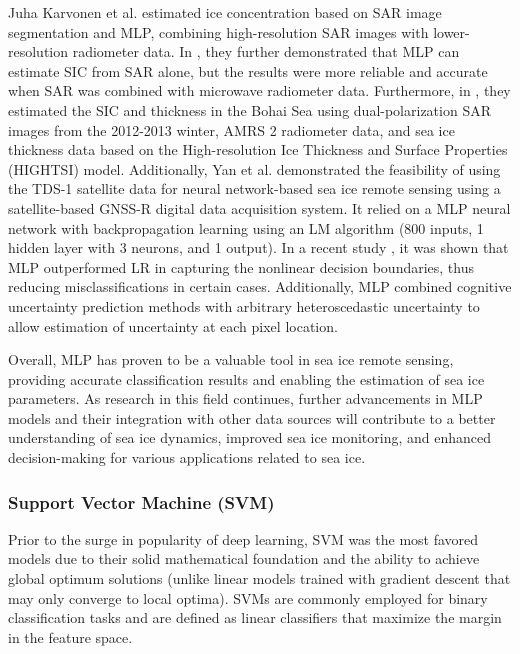 Juha Karvonen et al. \cite{49karvonen2014sea} estimated ice concentration based on SAR image segmentation and MLP, combining high-resolution SAR images with lower-resolution radiometer data. In \cite{50karvonen2017baltic}, they further demonstrated that MLP can estimate SIC from SAR alone, but the results were more reliable and accurate when SAR was combined with microwave radiometer data. Furthermore, in \cite{52karvonen2017bohai}, they estimated the SIC and thickness in the Bohai Sea using dual-polarization SAR images from the 2012-2013 winter, AMRS 2 radiometer data, and sea ice thickness data based on the High-resolution Ice Thickness and Surface Properties (HIGHTSI) model. Additionally, Yan et al. \cite{51yan2017neural} demonstrated the feasibility of using the TDS-1 satellite data for neural network-based sea ice remote sensing using a satellite-based GNSS-R digital data acquisition system. It relied on a MLP neural network with backpropagation learning using an LM algorithm (800 inputs, 1 hidden layer with 3 neurons, and 1 output). In a recent study \cite{53asadi2020evaluation}, it was shown that MLP outperformed LR in capturing the nonlinear decision boundaries, thus reducing misclassifications in certain cases. Additionally, MLP combined cognitive uncertainty prediction methods with arbitrary heteroscedastic uncertainty to allow estimation of uncertainty at each pixel location.

Overall, MLP has proven to be a valuable tool in sea ice remote sensing, providing accurate classification results and enabling the estimation of sea ice parameters. As research in this field continues, further advancements in MLP models and their integration with other data sources will contribute to a better understanding of sea ice dynamics, improved sea ice monitoring, and enhanced decision-making for various applications related to sea ice.

\subsubsection{Support Vector Machine (SVM)}
Prior to the surge in popularity of deep learning, SVM was the most favored models due to their solid mathematical foundation and the ability to achieve global optimum solutions (unlike linear models trained with gradient descent that may only converge to local optima). SVMs are commonly employed for binary classification tasks and are defined as linear classifiers that maximize the margin in the feature space.

